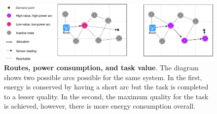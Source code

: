 \begin{figure}[ht]
	\centering
	\includegraphics[width=0.9\linewidth]{route-types}
	\caption{\textbf{Routes, power consumption, and task value}. The diagram shows two possible arcs possible for the same system. In the first, energy is conserved by having a short arc but the task is completed to a lesser quality. In the second, the maximum quality for the task is achieved, however, there is more energy consumption overall.}
	\label{fig:route-types}
\end{figure}


